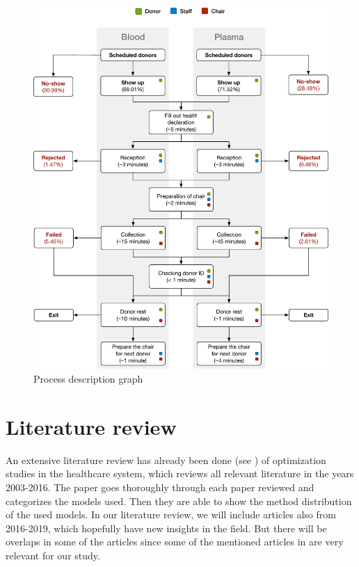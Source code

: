 \documentclass[a4paper,12pt]{article}
\begin{document}
\begin{figure}[H]
    \begin{center}
    \includegraphics[scale=0.6]{process.pdf}
    \end{center}
    \caption{Process description graph}
    \label{flow}
\end{figure}



\section{Literature review}

An extensive literature review has already been done (see \cite{BD32}) of optimization studies in the healthcare system, which reviews all relevant literature in the years 2003-2016. The paper goes thoroughly through each paper reviewed and categorizes the models used. Then they are able to show the method distribution of the used models. In our literature review, we will include articles also from 2016-2019, which hopefully have new insights in the field. But there will be overlaps in some of the articles since some of the mentioned articles in \cite{BD32} are very relevant for our study.
\end{document}
